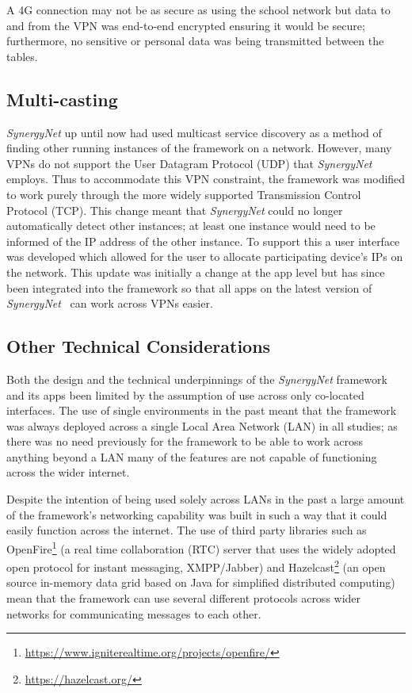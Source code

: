 \documentclass[twocolumn]{svjour3}          %
\begin{document}
A 4G connection may not be as secure as using the school network but data to and from the VPN was end-to-end encrypted ensuring it would be secure; furthermore, no sensitive or personal data was being transmitted between the tables.

\subsection{Multi-casting}

{\emph{SynergyNet}} up until now had used multicast service discovery as a method of finding other running instances of the framework on a network.
However, many VPNs do not support the User Datagram Protocol (UDP) that {\emph{SynergyNet}} employs.
Thus to accommodate this VPN constraint, the framework was modified to work purely through the more widely supported Transmission Control Protocol (TCP).
This change meant that {\emph{SynergyNet}} could no longer automatically detect other instances; at least one instance would need to be informed of the IP address of the other instance.
To support this a user interface was developed which allowed for the user to allocate participating device's IPs on the network.
This update was initially a change at the app level but has since been integrated into the framework so that all apps on the latest version of {\emph{SynergyNet}}~\citep{hatch:2011} can work across VPNs easier.

\subsection{Other Technical Considerations}

Both the design and the technical underpinnings of the {\emph{SynergyNet}} framework and its apps been limited by the assumption of use across only co-located interfaces.
The use of single environments in the past meant that the framework was always deployed across a single Local Area Network (LAN) in all studies; as there was no need previously for the framework to be able to work across anything beyond a LAN many of the features are not capable of functioning across the wider internet.

Despite the intention of being used solely across LANs in the past a large amount of the framework's networking capability was built in such a way that it could easily function across the internet.
The use of third party libraries such as OpenFire\footnote{\url{https://www.igniterealtime.org/projects/openfire/}} (a real time collaboration (RTC) server that uses the widely adopted open protocol for instant messaging, XMPP/Jabber) and Hazelcast\footnote{\url{https://hazelcast.org/}} (an open source in-memory data grid based on Java for simplified distributed computing) mean that the framework can use several different protocols across wider networks for communicating messages to each other.
\end{document}
